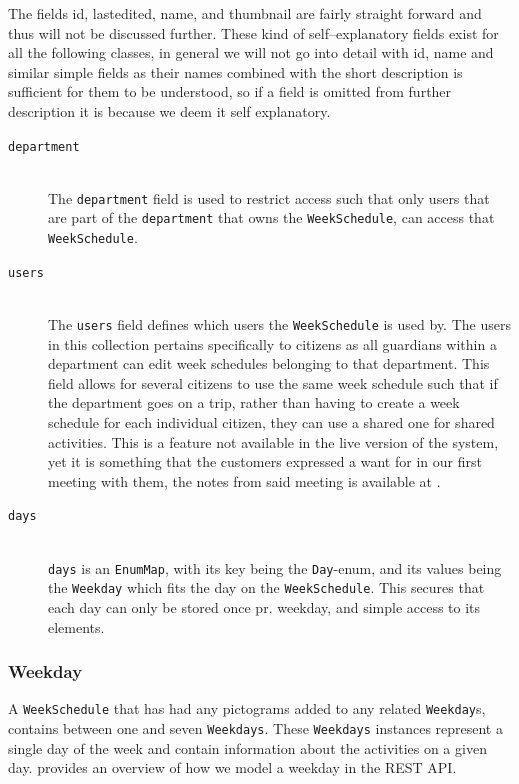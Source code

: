 \noindent
The fields id, lastedited, name, and thumbnail are fairly straight forward and thus will not be discussed further.
These kind of self--explanatory fields exist for all the following classes, in general we will not go into detail with id, name and similar simple fields as their names combined with the short description is sufficient for them to be understood, so if a field is omitted from further description it is because we deem it self explanatory.
\begin{description}
    \item [\texttt{department}] \hfill \\
    The \texttt{department} field is used to restrict access such that only users that are part of the \texttt{department} that owns the \texttt{WeekSchedule}, can access that \texttt{WeekSchedule}.
    \item [\texttt{users}] \hfill \\
    The \texttt{users} field defines which users the \texttt{WeekSchedule} is used by.
    The users in this collection pertains specifically to citizens as all guardians within a department can edit week schedules belonging to that department.
    This field allows for several citizens to use the same week schedule such that if the department goes on a trip, rather than having to create a week schedule for each individual citizen, they can use a shared one for shared activities.
    This is a feature not available in the live version of the system, yet it is something that the customers expressed a want for in our first meeting with them, the notes from said meeting is available at \citep{GIRAF20161stMeeting}.
    \item [\texttt{days}] \hfill \\
    \texttt{days} is an \texttt{EnumMap}, with its key being the \texttt{Day}-enum, and its values being the \texttt{Weekday} which fits the day on the \texttt{WeekSchedule}.
    This secures that each day can only be stored once pr. weekday, and simple access to its elements.
\end{description}

\subsubsection{Weekday}
A \texttt{WeekSchedule} that has had any pictograms added to any related \texttt{Weekday}s, contains between one and seven \texttt{Weekdays}.
These \texttt{Weekdays} instances represent a single day of the week and contain information about the activities on a given day.
 provides an overview of how we model a weekday in the REST API.

